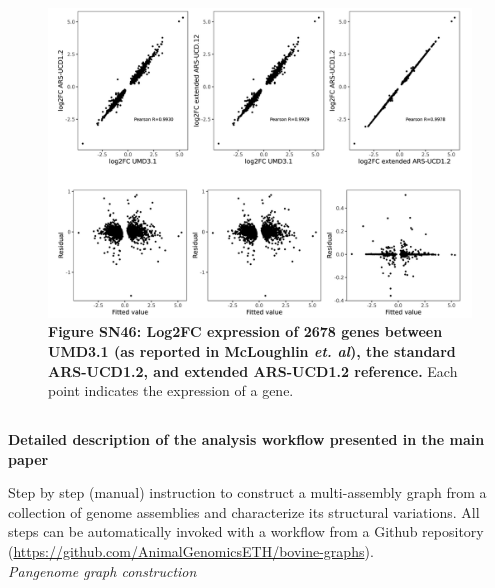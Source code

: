 \documentclass[../main.tex]{subfiles}
\begin{document}
\begin{flushleft}
\bigskip
\begin{figure}[!htb]
    \centering
    \includegraphics[width=\textwidth]{paper3/supplement/sp420.png}
    \caption*{\textbf{\hypertarget{Figure SN46}{Figure SN46}: Log2FC expression of 2678 genes between UMD3.1 (as reported in McLoughlin \emph{et. al}), the standard ARS-UCD1.2, and extended ARS-UCD1.2 reference.} Each point indicates the expression of a gene.}
\end{figure}

\clearpage

\subsection{}
\label{sup_not:s45}
\textbf{Detailed description of the analysis workflow presented in the main paper}
\bigskip

Step by step (manual) instruction to construct a multi-assembly graph from a collection of genome assemblies and characterize its structural variations. All steps can be automatically invoked with a workflow from a Github repository (\url{https://github.com/AnimalGenomicsETH/bovine-graphs}). \\ 
\bigskip 
\emph{Pangenome graph construction}

\bigskip 


\end{flushleft}
\end{document}

